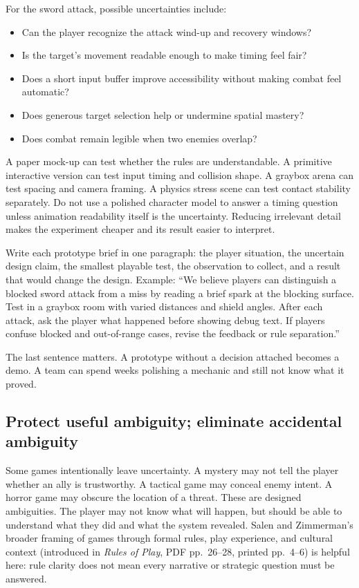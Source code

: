For the sword attack, possible uncertainties include:

\begin{itemize}
\tightlist
\item
  Can the player recognize the attack wind-up and recovery windows?
\item
  Is the target's movement readable enough to make timing feel fair?
\item
  Does a short input buffer improve accessibility without making combat feel automatic?
\item
  Does generous target selection help or undermine spatial mastery?
\item
  Does combat remain legible when two enemies overlap?
\end{itemize}

A paper mock-up can test whether the rules are understandable. A primitive interactive version can test input timing and collision shape. A graybox arena can test spacing and camera framing. A physics stress scene can test contact stability separately. Do not use a polished character model to answer a timing question unless animation readability itself is the uncertainty. Reducing irrelevant detail makes the experiment cheaper and its result easier to interpret.

Write each prototype brief in one paragraph: the player situation, the uncertain design claim, the smallest playable test, the observation to collect, and a result that would change the design. Example: ``We believe players can distinguish a blocked sword attack from a miss by reading a brief spark at the blocking surface. Test in a graybox room with varied distances and shield angles. After each attack, ask the player what happened before showing debug text. If players confuse blocked and out-of-range cases, revise the feedback or rule separation.''

The last sentence matters. A prototype without a decision attached becomes a demo. A team can spend weeks polishing a mechanic and still not know what it proved.

\subsection{Protect useful ambiguity; eliminate accidental ambiguity}\label{05-engine-i-ch009-protect-useful-ambiguity-eliminate-accidental-ambiguity}

Some games intentionally leave uncertainty. A mystery may not tell the player whether an ally is trustworthy. A tactical game may conceal enemy intent. A horror game may obscure the location of a threat. These are designed ambiguities. The player may not know what will happen, but should be able to understand what they did and what the system revealed. Salen and Zimmerman's broader framing of games through formal rules, play experience, and cultural context (introduced in \emph{Rules of Play}, PDF pp.~26--28, printed pp.~4--6) is helpful here: rule clarity does not mean every narrative or strategic question must be answered.

